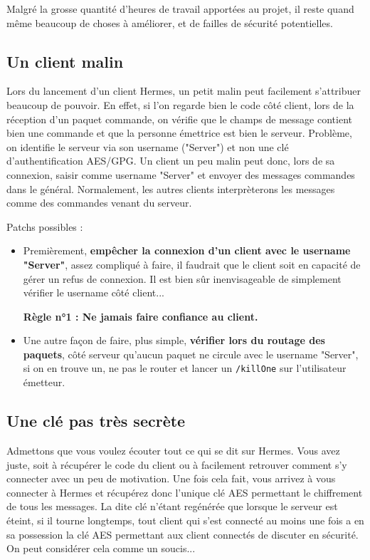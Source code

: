 \documentclass{article}
\begin{document}
Malgré la grosse quantité d'heures de travail apportées au projet, il reste quand même beaucoup de choses à améliorer, et de failles de sécurité potentielles. 

\subsection{Un client malin}

Lors du lancement d'un client Hermes, un petit malin peut facilement s'attribuer beaucoup de pouvoir. 
En effet, si l'on regarde bien le code côté client, lors de la réception d'un paquet commande, on vérifie
que le champs de message contient bien une commande et que la personne émettrice est bien le serveur. 
Problème, on identifie le serveur via son username ("Server") et non une clé d'authentification AES/GPG. 
Un client un peu malin peut donc, lors de sa connexion, saisir comme username "Server" et envoyer des messages commandes 
dans le général. Normalement, les autres clients interprèterons les messages comme des commandes venant du serveur. 

\vspace{0.5cm}

Patchs possibles : 
\begin{itemize}
    \item Premièrement, \textbf{empêcher la connexion d'un client avec le username "Server"}, assez compliqué 
    à faire, il faudrait que le client soit en capacité de gérer un refus de connexion. Il est bien sûr inenvisageable de simplement 
    vérifier le username côté client... 
        \begin{center}
            \textbf{Règle n°1 : Ne jamais faire confiance au client.}
        \end{center}
    \item Une autre façon de faire, plus simple, \textbf{vérifier lors du routage des paquets}, côté serveur qu'aucun paquet ne circule avec le 
    username "Server", si on en trouve un, ne pas le router et lancer un \texttt{/killOne} sur l'utilisateur émetteur.
\end{itemize}

\subsection{Une clé pas très secrète}

Admettons que vous voulez écouter tout ce qui se dit sur Hermes. Vous avez juste, soit à récupérer le code du client ou à 
facilement retrouver comment s'y connecter avec un peu de motivation. 
Une fois cela fait, vous arrivez à vous connecter à Hermes et récupérez donc l'unique clé AES permettant le chiffrement de tous les 
messages. La dite clé n'étant regénérée que lorsque le serveur est éteint, si il tourne longtemps, tout client qui s'est connecté au moins 
une fois a en sa possession la clé AES permettant aux client connectés de discuter en sécurité. 
On peut considérer cela comme un soucis...
\end{document}
